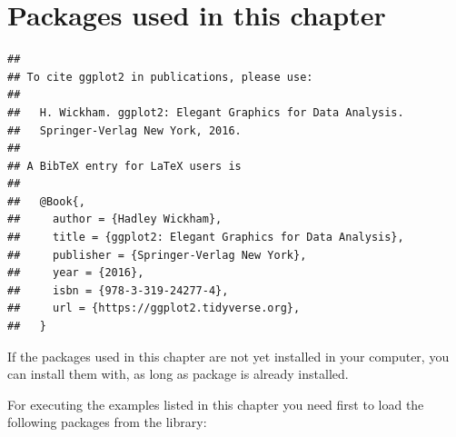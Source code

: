 \documentclass[krantz2]{krantz}\usepackage{knitr}%
\begin{document}
\section{Packages used in this chapter}

\begin{knitrout}\footnotesize
{}\color{fgcolor}\begin{kframe}
\begin{alltt}
\hlstd{(} \hlstd{=} \hlstd{)}
\end{alltt}
\begin{verbatim}
## 
## To cite ggplot2 in publications, please use:
## 
##   H. Wickham. ggplot2: Elegant Graphics for Data Analysis.
##   Springer-Verlag New York, 2016.
## 
## A BibTeX entry for LaTeX users is
## 
##   @Book{,
##     author = {Hadley Wickham},
##     title = {ggplot2: Elegant Graphics for Data Analysis},
##     publisher = {Springer-Verlag New York},
##     year = {2016},
##     isbn = {978-3-319-24277-4},
##     url = {https://ggplot2.tidyverse.org},
##   }
\end{verbatim}
\end{kframe}
\end{knitrout}

If the packages used in this chapter are not yet installed in your computer, you can install them with, as long as package  is already installed.

\begin{knitrout}\footnotesize
{}\color{fgcolor}\begin{kframe}
\begin{alltt}
\hlopt{::}
\end{alltt}
\end{kframe}
\end{knitrout}

For executing the examples listed in this chapter you need first to load the following packages from the library:

\begin{knitrout}\footnotesize
{}\color{fgcolor}\begin{kframe}
\begin{alltt}
\end{alltt}
\end{kframe}
\end{knitrout}
\end{document}
